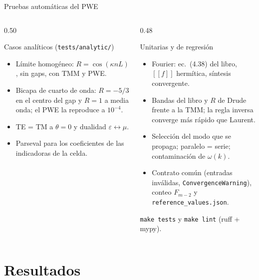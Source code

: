 \documentclass[aspectratio=169,10pt]{beamer}
\begin{document}
\begin{frame}{Pruebas automáticas del PWE}
  \begin{columns}[T]
    \begin{column}{0.50\textwidth}
      \begin{block}{Casos analíticos (\texttt{tests/analytic/})}
        \small
        \begin{itemize}
          \item Límite homogéneo: $R=\cos(\kappa nL)$, sin gaps, con TMM y PWE.
          \item Bicapa de cuarto de onda: $R=-5/3$ en el centro del gap y $R=1$ a media onda; el PWE la
            reproduce a $10^{-4}$.
          \item TE = TM a $\theta=0$ y dualidad $\varepsilon\leftrightarrow\mu$.
          \item Parseval para los coeficientes de las indicadoras de la celda.
        \end{itemize}
      \end{block}
    \end{column}
    \begin{column}{0.48\textwidth}
      \begin{block}{Unitarias y de regresión}
        \small
        \begin{itemize}
          \item Fourier: ec.~(4.38) del libro, $[\![f]\!]$ hermítica, síntesis convergente.
          \item Bandas del libro y $R$ de Drude frente a la TMM; la regla inversa converge más rápido que Laurent.
          \item Selección del modo que se propaga; paralelo = serie; contaminación de $\omega(k)$.
          \item Contrato común (entradas inválidas, \texttt{ConvergenceWarning}), conteo $F_{m-2}$ y
            \texttt{reference\_values.json}.
        \end{itemize}
      \end{block}
      \small \texttt{make tests} y \texttt{make lint} (ruff + mypy).
    \end{column}
  \end{columns}
\end{frame}

\section{Resultados}
\end{document}
